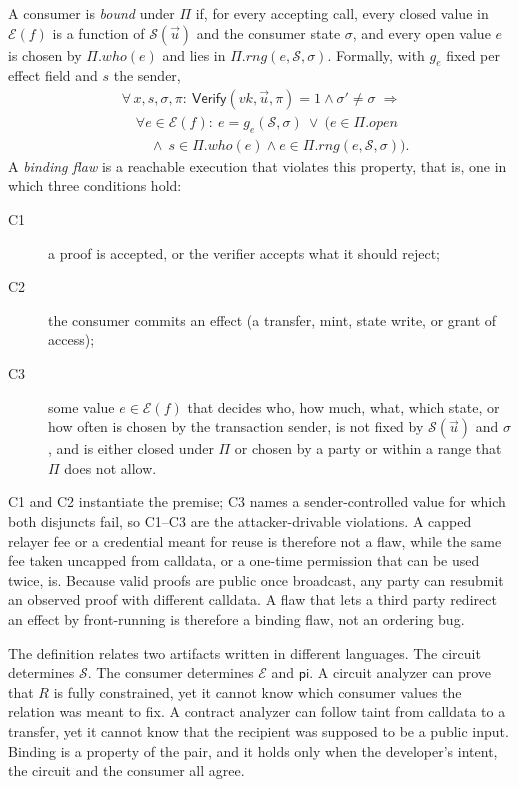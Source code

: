 A consumer is \emph{bound} under $\Pi$ if, for every accepting call, every
closed value in $\mathcal{E}(f)$ is a function of $\mathcal{S}(\vec{u})$ and
the consumer state $\sigma$, and every open value $e$ is chosen by
$\Pi.\mathit{who}(e)$ and lies in $\Pi.\mathit{rng}(e,\mathcal{S},\sigma)$.
Formally, with $g_e$ fixed per effect field and $s$ the sender,
\[
\begin{aligned}
&\forall\, x,s,\sigma,\pi:\ \mathsf{Verify}(\mathit{vk},\vec{u},\pi)=1
\land \sigma'\neq\sigma \;\Rightarrow\\
&\quad \forall e\in\mathcal{E}(f):\ e = g_e(\mathcal{S},\sigma)\ \lor\ \bigl(e\in\Pi.\mathit{open}\\
&\qquad \land\ s\in\Pi.\mathit{who}(e) \land e\in\Pi.\mathit{rng}(e,\mathcal{S},\sigma)\bigr).
\end{aligned}
\]
A \emph{binding flaw} is a reachable execution that violates this property,
that is, one in which three conditions hold:
\begin{description}
\item[C1] a proof is accepted, or the verifier accepts what it should reject;
\item[C2] the consumer commits an effect (a transfer, mint, state write, or
grant of access);
\item[C3] some value $e \in \mathcal{E}(f)$ that decides who, how much, what,
which state, or how often is chosen by the transaction sender, is not fixed
by $\mathcal{S}(\vec{u})$ and $\sigma$, and is either closed under $\Pi$ or
chosen by a party or within a range that $\Pi$ does not allow.
\end{description}
C1 and C2 instantiate the premise; C3 names a sender-controlled value for
which both disjuncts fail, so C1--C3 are the attacker-drivable violations. A
capped relayer fee or a credential meant for reuse is therefore not a flaw,
while the same fee taken uncapped from calldata, or a one-time permission that
can be used twice, is. Because valid proofs are public once broadcast, any
party can resubmit an observed proof with different calldata. A flaw that
lets a third party redirect an effect by front-running is therefore a binding
flaw, not an ordering bug.

The definition relates two artifacts written in different languages. The
circuit determines $\mathcal{S}$. The consumer determines $\mathcal{E}$ and
$\mathsf{pi}$. A circuit analyzer can prove that $R$ is fully constrained, yet
it cannot know which consumer values the relation was meant to fix. A contract
analyzer can follow taint from calldata to a transfer, yet it cannot know that
the recipient was supposed to be a public input. Binding is a property of the
pair, and it holds only when the developer's intent, the circuit and the
consumer all agree.

